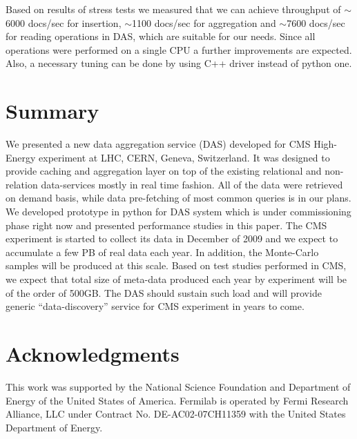 \documentclass[1p,times]{elsarticle}
\begin{document}
Based on results of stress tests we measured that we can achieve throughput of
$\sim$6000 docs/sec for insertion, $\sim$1100 docs/sec for aggregation and 
$\sim$7600 docs/sec for 
reading operations in DAS, which are suitable for our needs. Since all 
operations were performed on a single CPU a further improvements are expected. 
Also, a necessary tuning can be done by using C++ driver instead of python one.

\section{Summary}
We presented a new data aggregation service (DAS) developed for CMS High-Energy experiment
at LHC, CERN, Geneva, Switzerland. It was designed to provide caching and
aggregation layer on top of the existing relational and non-relation data-services
mostly in real time fashion. All of the data were retrieved on demand basis,
while data pre-fetching of most common queries is in our plans. We developed
prototype in python for DAS system which is under commissioning phase right now 
and presented performance studies in this paper. 
The CMS experiment is started to collect its data in December of 2009 and 
we expect to accumulate a few PB of real data each year. 
In addition, the Monte-Carlo samples will be produced at this scale.
Based on test studies performed in CMS, we expect that total size of
meta-data produced each year by experiment will be of the order of
500GB. The DAS should sustain such load and will provide generic 
``data-discovery'' service for CMS experiment in years to come.

\section{Acknowledgments}

This work was supported by the National Science Foundation and 
Department of Energy of the United States of America. 
Fermilab is operated by Fermi Research Alliance, LLC under Contract
No. DE-AC02-07CH11359 with the United States Department of Energy.



%
%
\end{document}
